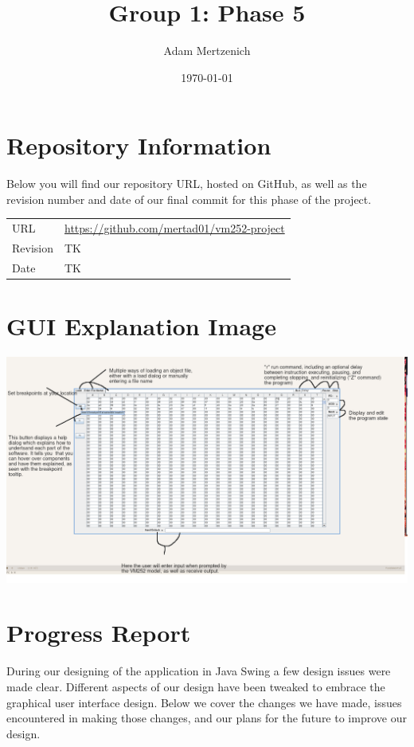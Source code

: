 \documentclass[11pt]{article}
\author{Adam Mertzenich}
\date{\today}
\title{Group 1: Phase 5}
\begin{document}
\maketitle
\tableofcontents


\section{Repository Information}
\label{sec:orgdeb76b7}

Below you will find our repository URL, hosted on GitHub, as well as the revision number and date of our final commit for this phase of the project.

\begin{center}
\begin{tabular}{ll}
URL & \url{https://github.com/mertad01/vm252-project}\\
Revision & TK\\
Date & TK\\
\end{tabular}
\end{center}

\section{GUI Explanation Image}
\label{sec:org9781b08}

\begin{center}
\includegraphics[width=.9\linewidth]{./annotated-screenshot.png}
\end{center}

\section{Progress Report}
\label{sec:orgeb22bce}

During our designing of the application in Java Swing a few design issues were made clear. Different aspects of our design have been tweaked to embrace the graphical user interface design. Below we cover the changes we have made, issues encountered in making those changes, and our plans for the future to improve our design.
\end{document}
